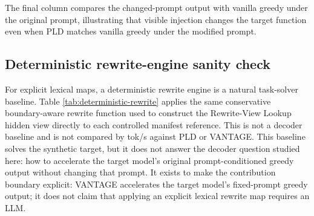 \documentclass[11pt,a4paper]{article}
\begin{document}
\begin{table}[h]
\centering\scriptsize
\caption{Changed-prompt visible transformed-reference baseline, measured on
the bf16/sdpa timing backend. It is faster in absolute tok/s on these
controlled rows, but it changes the prompt and target greedy function; raw
tok/s should not be read as backend-normalized against the fp32/sdpa headline.
Exact target and syntax are computed after raw code-block extraction; rewrite
compliance is a conservative local boundary-aware check from the generated
summary.}
\label{tab:prompt-injection-quality}
\end{table}

The final column compares the changed-prompt output with vanilla greedy under
the original prompt, illustrating that visible injection changes the target
function even when PLD matches vanilla greedy under the modified prompt.

\subsection{Deterministic rewrite-engine sanity check}

For explicit lexical maps, a deterministic rewrite engine is a natural
task-solver baseline. Table \ref{tab:deterministic-rewrite} applies the same
conservative boundary-aware rewrite function used to construct the Rewrite-View
Lookup hidden view directly to each controlled manifest reference. This is not a
decoder baseline and is not compared by tok/s against PLD or VANTAGE. This baseline
solves the synthetic target, but it does not answer the decoder question studied
here: how to accelerate the target model's original prompt-conditioned greedy
output without changing that prompt. It
exists to make the contribution boundary explicit: VANTAGE accelerates the
target model's fixed-prompt greedy output; it does not claim that applying an
explicit lexical rewrite map requires an LLM.
\end{document}
